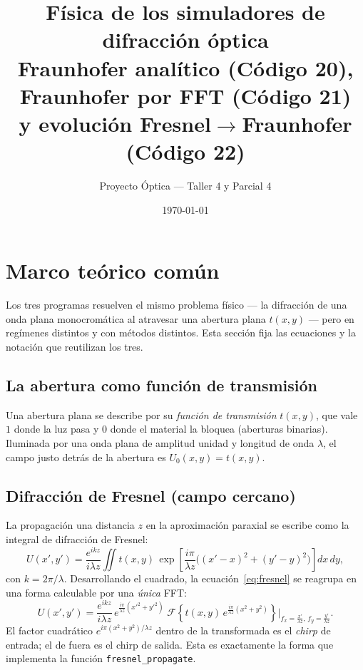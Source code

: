 \documentclass[11pt,a4paper]{article}
\title{\textbf{Física de los simuladores de difracción óptica}\\[4pt]
\large Fraunhofer analítico (C\'odigo 20), Fraunhofer por FFT (C\'odigo 21)\\
y evoluci\'on Fresnel$\rightarrow$Fraunhofer (C\'odigo 22)}
\author{Proyecto Óptica --- Taller 4 y Parcial 4}
\date{\today}
\newcommand{\Fou}{\mathcal{F}}
\begin{document}
\maketitle
\tableofcontents
\bigskip

\section{Marco teórico común}

Los tres programas resuelven el mismo problema físico --- la difracción de una
onda plana monocromática al atravesar una abertura plana $t(x,y)$ --- pero en
regímenes distintos y con métodos distintos. Esta sección fija las ecuaciones y
la notación que reutilizan los tres.

\subsection{La abertura como función de transmisión}
Una abertura plana se describe por su \emph{función de transmisión} $t(x,y)$, que
vale $1$ donde la luz pasa y $0$ donde el material la bloquea (aberturas
binarias). Iluminada por una onda plana de amplitud unidad y longitud de onda
$\lambda$, el campo justo detrás de la abertura es $U_0(x,y)=t(x,y)$.

\subsection{Difracción de Fresnel (campo cercano)}
La propagación una distancia $z$ en la aproximación paraxial se escribe como la
integral de difracción de Fresnel:
\begin{equation}
U(x',y') = \frac{e^{ikz}}{i\lambda z}
\iint t(x,y)\,
\exp\!\left[\frac{i\pi}{\lambda z}\big((x'-x)^2+(y'-y)^2\big)\right] dx\,dy,
\label{eq:fresnel}
\end{equation}
con $k=2\pi/\lambda$. Desarrollando el cuadrado, la ecuación~\eqref{eq:fresnel}
se reagrupa en una forma calculable por una \emph{única} FFT:
\begin{equation}
U(x',y') = \frac{e^{ikz}}{i\lambda z}\,
e^{\frac{i\pi}{\lambda z}(x'^2+y'^2)}\;
\Fou\!\left\{ t(x,y)\, e^{\frac{i\pi}{\lambda z}(x^2+y^2)} \right\}
\Bigg|_{f_x=\frac{x'}{\lambda z},\, f_y=\frac{y'}{\lambda z}}.
\label{eq:fresnel_fft}
\end{equation}
El factor cuadrático $e^{i\pi(x^2+y^2)/\lambda z}$ dentro de la transformada es el
\emph{chirp} de entrada; el de fuera es el chirp de salida. Esta es exactamente la
forma que implementa la función \texttt{fresnel\_propagate}.
\end{document}

